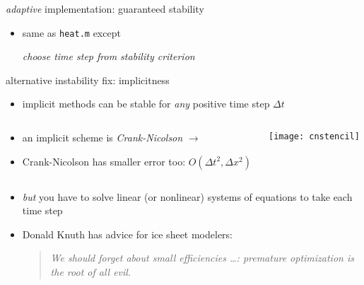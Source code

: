 \begin{frame}{\textsl{adaptive} implementation: guaranteed stability}


\begin{itemize}
\item same as \texttt{heat.m} except

\begin{center}
\emph{choose time step from stability criterion}
\end{center}
\end{itemize}\end{frame}


\begin{frame}{alternative instability fix: implicitness}

\begin{itemize}
\item \alert{implicit} methods can be stable for \emph{any} positive time step $\Delta t$
\end{itemize}

\begin{columns}
\begin{column}{0.7\textwidth}
\small
\begin{itemize}
\item an implicit scheme is \emph{Crank-Nicolson} $\longrightarrow$
\item Crank-Nicolson has smaller error too: $O(\Delta t^2,\Delta x^2)$
\end{itemize}
\normalsize
\end{column}
\begin{column}{0.3\textwidth}
\texttt{[image: cnstencil]}
\end{column}
\end{columns}

\begin{itemize}
\item \emph{but} you have to solve linear (or nonlinear) systems of equations to take each time step
\medskip

\item \scriptsize Donald Knuth has advice for ice sheet modelers: \begin{quote}
\emph{We should forget about small efficiencies \dots: premature optimization is the root of all evil}.
\end{quote}
\end{itemize}
\end{frame}


